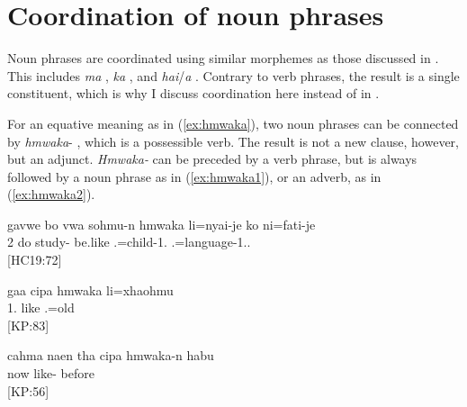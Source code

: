 


 \section{Coordination of noun phrases}
\label{sec:CordNP}

Noun phrases are coordinated using similar morphemes as those discussed in . This includes \textit{ma} , \textit{ka} , and \textit{hai}/\textit{a} . Contrary to verb phrases, the result is a single constituent, which is why I discuss coordination here instead of in .

For an equative meaning as in (\ref{ex:hmwaka}), two noun phrases can be connected by \textit{hmwaka}- , which is a possessible verb. The result is not a new clause, however, but an adjunct. \textit{Hmwaka-} can be preceded by a verb phrase, but is always followed by a noun phrase as in (\ref{ex:hmwaka1}), or an adverb, as in (\ref{ex:hmwaka2}).


\ea\label{ex:hmwaka1}
\gll gavwe bo vwa sohmu-n hmwaka li=nyai-je ko ni=fati-je\\
 2  do study- be.like .=child-1.  .=language-1..\\
\glt {} {[HC19:72]}
\z

\ea\label{ex:hmwaka}
\gll gaa cipa hmwaka li=xhaohmu \\
 1.  like .=old\\
\glt {} {[KP:83]}
\z


\ea\label{ex:hmwaka2}
\gll cahma naen tha cipa hmwaka-n habu\\
  now   like- before\\
\glt {} {[KP:56]}
\z

